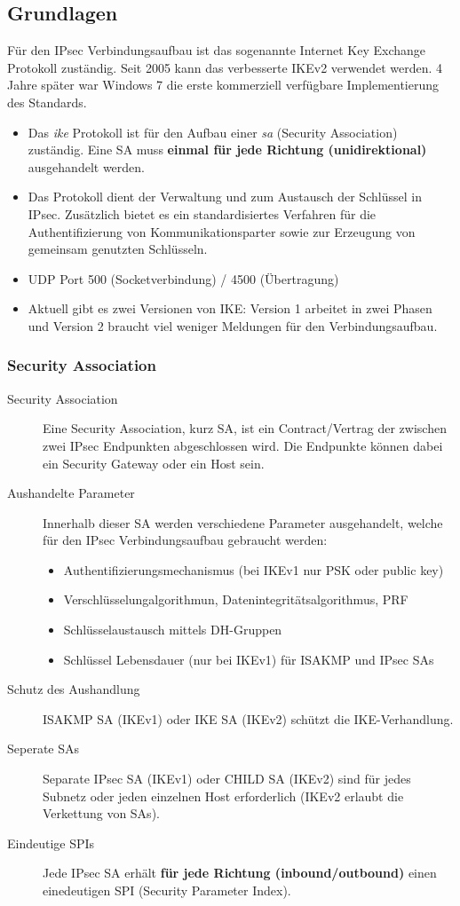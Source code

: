 \subsection{Grundlagen}
Für den IPsec Verbindungsaufbau ist das sogenannte Internet Key Exchange Protokoll zuständig. Seit 2005 kann das verbesserte IKEv2 verwendet werden. 4 Jahre später war Windows 7 die erste kommerziell verfügbare Implementierung des Standards.
\begin{itemize}
	\item Das \textit{ike} Protokoll ist für den Aufbau einer \textit{sa} (Security Association) zuständig. Eine SA muss \textbf{einmal für jede Richtung (unidirektional)} ausgehandelt werden.
	\item Das Protokoll dient der Verwaltung und zum Austausch der Schlüssel in IPsec. Zusätzlich bietet es ein standardisiertes Verfahren für die Authentifizierung von Kommunikationsparter sowie zur Erzeugung von gemeinsam genutzten Schlüsseln.
	\item UDP Port 500 (Socketverbindung) / 4500 (Übertragung)
	\item Aktuell gibt es zwei Versionen von IKE: Version 1 arbeitet in zwei Phasen und Version 2 braucht viel weniger Meldungen für den Verbindungsaufbau. 
\end{itemize}

\subsubsection{Security Association}
\begin{description}
    \item [Security Association] Eine Security Association, kurz SA, ist ein Contract/Vertrag der zwischen zwei IPsec Endpunkten abgeschlossen wird. Die Endpunkte können dabei ein Security Gateway oder ein Host sein.
    \item [Aushandelte Parameter] Innerhalb dieser SA werden verschiedene Parameter ausgehandelt, welche für den IPsec Verbindungsaufbau gebraucht werden:
    \begin{itemize}
        \item Authentifizierungsmechanismus (bei IKEv1 nur PSK oder public key)
        \item Verschlüsselungalgorithmun, Datenintegritätsalgorithmus, PRF
        \item Schlüsselaustausch mittels DH-Gruppen
        \item Schlüssel Lebensdauer (nur bei IKEv1) für ISAKMP und IPsec SAs
    \end{itemize}
    \item [Schutz des Aushandlung] ISAKMP SA (IKEv1) oder IKE SA (IKEv2) schützt die IKE-Verhandlung.
    \item [Seperate SAs] Separate IPsec SA (IKEv1) oder CHILD SA (IKEv2) sind für jedes Subnetz oder jeden einzelnen Host erforderlich (IKEv2 erlaubt die Verkettung von SAs).
\item [Eindeutige SPIs] Jede IPsec SA erhält \textbf{für jede Richtung (inbound/outbound)} einen einedeutigen SPI (Security Parameter Index).
    \end{description}
